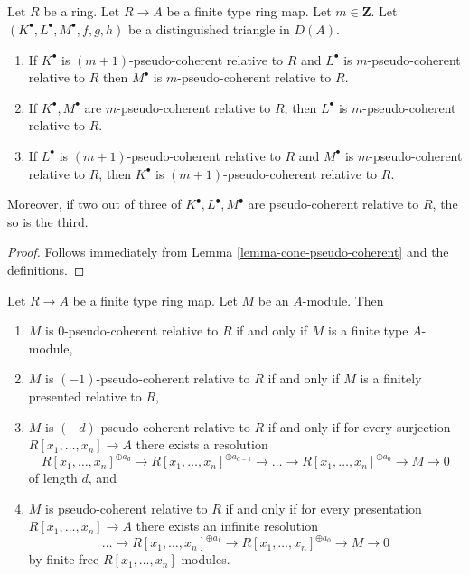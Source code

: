 \begin{lemma}
\label{lemma-cone-relatively-pseudo-coherent}
Let $R$ be a ring. Let $R \to A$ be a finite type ring map.
Let $m \in \mathbf{Z}$. Let $(K^\bullet, L^\bullet, M^\bullet, f, g, h)$
be a distinguished triangle in $D(A)$.
\begin{enumerate}
\item If $K^\bullet$ is $(m + 1)$-pseudo-coherent relative to $R$ and
$L^\bullet$ is $m$-pseudo-coherent relative to $R$ then $M^\bullet$ is
$m$-pseudo-coherent relative to $R$.
\item If $K^\bullet, M^\bullet$ are $m$-pseudo-coherent relative to $R$,
then $L^\bullet$ is $m$-pseudo-coherent relative to $R$.
\item If $L^\bullet$ is $(m + 1)$-pseudo-coherent relative to $R$
and $M^\bullet$ is $m$-pseudo-coherent relative to $R$, then
$K^\bullet$ is $(m + 1)$-pseudo-coherent relative to $R$.
\end{enumerate}
Moreover, if two out of three of $K^\bullet, L^\bullet, M^\bullet$
are pseudo-coherent relative to $R$, the so is the third.
\end{lemma}

\begin{proof}
Follows immediately from
Lemma \ref{lemma-cone-pseudo-coherent}
and the definitions.
\end{proof}

\begin{lemma}
\label{lemma-rel-n-pseudo-module}
Let $R \to A$ be a finite type ring map. Let $M$ be an $A$-module.
Then
\begin{enumerate}
\item $M$ is $0$-pseudo-coherent relative to $R$ if and only if
$M$ is a finite type $A$-module,
\item $M$ is $(-1)$-pseudo-coherent relative to $R$ if and only if
$M$ is a finitely presented relative to $R$,
\item $M$ is $(-d)$-pseudo-coherent relative to $R$ if and only if
for every surjection $R[x_1, \ldots, x_n] \to A$ there exists a
resolution
$$
R[x_1, \ldots, x_n]^{\oplus a_d} \to R[x_1, \ldots, x_n]^{\oplus a_{d - 1}}
\to \ldots \to R[x_1, \ldots, x_n]^{\oplus a_0} \to M \to 0
$$
of length $d$, and
\item $M$ is pseudo-coherent relative to $R$ if and only if
for every presentation $R[x_1, \ldots, x_n] \to A$ there exists an
infinite resolution
$$
\ldots \to R[x_1, \ldots, x_n]^{\oplus a_1} \to
R[x_1, \ldots, x_n]^{\oplus a_0} \to M \to 0
$$
by finite free $R[x_1, \ldots, x_n]$-modules.
\end{enumerate}
\end{lemma}


